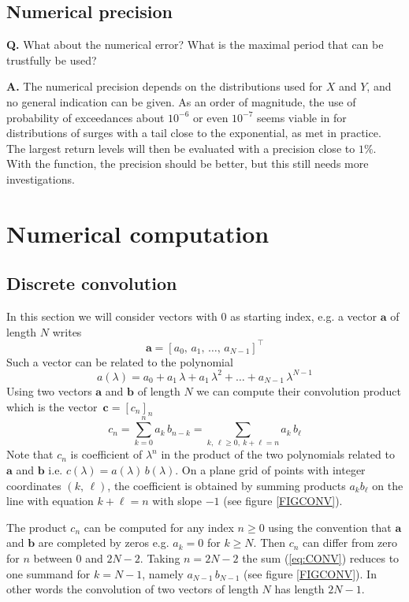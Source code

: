 \documentclass[11pt,a4paper]{report}\usepackage[]{graphicx}\usepackage[]{color}
\newcommand{\m}{\mathbf}
\begin{document}
\section{Numerical precision}
\noindent
\textbf{Q.} What about the numerical error? What is the maximal period
that can be trustfully be used?
\par\medskip\noindent
\textbf{A.} The numerical precision depends on the distributions used for $X$
and $Y$, and no general indication can be given. As an order of magnitude, the
use of probability of exceedances about $10^{-6}$ or even $10^{-7}$ seems viable
in \verb@convSL@ for distributions of surges with a tail close to the
exponential, as met in practice. The largest return levels will then be evaluated with a precision
close to $1\%$. With the \verb@GPtail@ function, the precision should be better,
but this still needs more investigations.


\appendix

\chapter{Numerical computation}
\section{Discrete  convolution}
In this section we will consider vectors with $0$ as starting index,
e.g. a vector $\m{a}$ of length $N$ writes 
$$
   \m{a} = [ a_0,\,a_1,\,\dots,\,a_{N-1}]^\top
$$
Such a vector can be related to the polynomial
$$
  a(\lambda) = a_0 + a_1\,\lambda + a_1\,\lambda^2 + \dots 
  + a_{N-1} \,\lambda^{N-1}
$$
Using two vectors $\m{a}$ and $\m{b}$ of length $N$ we can
compute their convolution product which is the vector~$\m{c}=[c_n]_n$
\begin{equation}
  \label{eq:CONV}
  c_n  = \sum_{k=0}^n a_{k}\,b_{n-k} 
  = \sum_{k,\,\ell \geqslant 0, \:k+\ell=n} a_{k}\,b_{\ell} 
\end{equation}
Note that $c_n$ is coefficient of $\lambda^n$ in the product of the two polynomials
related to $\m{a}$ and $\m{b}$ i.e.  $c(\lambda)= a(\lambda)\,b(\lambda)$. On a
plane grid of points with integer coordinates $(k,\,\ell)$, the coefficient is
obtained by summing products $a_kb_\ell$ on the line with equation $k+\ell =n$
with slope $-1$ (see figure \ref{FIGCONV}).

The product $c_n$ can be computed for any index $n\geqslant 0$ using the convention
that $\m{a}$ and  $\m{b}$ are completed by zeros e.g. $a_k=0$ for $k \geqslant N$.
Then $c_n$ can differ from zero for $n$ between $0$ and $2N-2$. Taking
$n=2N-2$ the sum (\ref{eq:CONV}) reduces to one summand
for $k=N-1$, namely $a_{N-1}\,b_{N-1}$ (see figure \ref{FIGCONV}). In other words
the convolution of two vectors of length $N$ has length $2N-1$.
\end{document}
